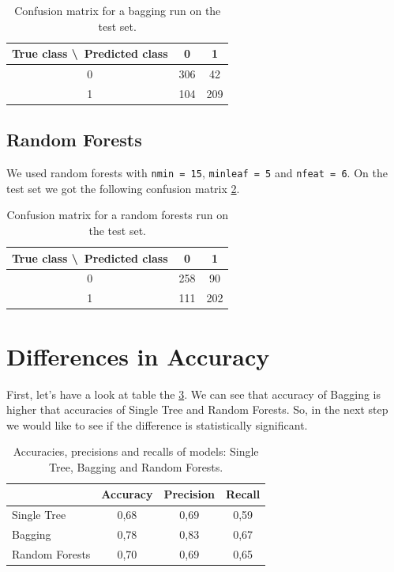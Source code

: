 \documentclass[a4paper,11pt]{article}
\begin{document}
\begin{table}[h!]
\centering
	\begin{tabular}{c||c|c}
	True class \textbackslash\ Predicted class & 0 & 1 \\ \hline \hline
	0 & 306 & 42 \\ \hline
	1 & 104 & 209
	\end{tabular}
	\caption{Confusion matrix for a bagging run on the test set.}
	\label{tab: bagging}
\end{table}



\subsection{Random Forests}
We used random forests with \verb|nmin = 15|, \verb|minleaf = 5| and  \verb|nfeat = 6|. On the test set we got the following confusion matrix \ref{tab: randomforest}.

\begin{table}[h!]
\centering
	\begin{tabular}{c||c|c}
	True class \textbackslash\ Predicted class & 0 & 1 \\ \hline \hline
	0 & 258 & 90 \\ \hline
	1 & 111 & 202
	\end{tabular}
	\caption{Confusion matrix for a random forests run on the test set.}
	\label{tab: randomforest}
\end{table}



\section{Differences in Accuracy}
First, let's have a look at table the \ref{tab: apr}. We can see that accuracy of Bagging is higher that accuracies of Single Tree and Random Forests. So, in the next step we would like to see if the difference is statistically significant.

\begin{table}[h!]
\centering
	\begin{tabular}{l||c|c|c}
	& Accuracy & Precision & Recall \\ \hline \hline
	Single Tree & 0{,}68 & 0{,}69 & 0{,}59 \\ \hline
	Bagging & 0{,}78 & 0{,}83 & 0{,}67 \\ \hline
	Random Forests & 0{,}70 & 0{,}69 & 0{,}65 
	\end{tabular}
	\caption{Accuracies, precisions and recalls of models: Single Tree, Bagging and Random Forests.}
	\label{tab: apr}
\end{table}
\end{document}
